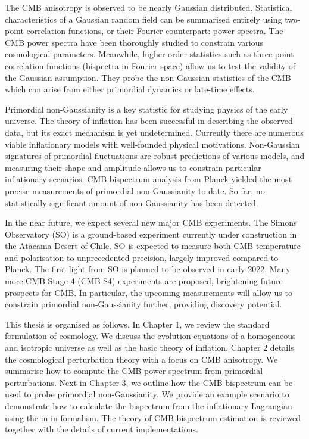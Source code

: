 The CMB anisotropy is observed to be nearly Gaussian distributed. Statistical characteristics of a Gaussian random field can be summarised entirely using two-point correlation functions, or their Fourier counterpart: power spectra. The CMB power spectra have been thoroughly studied to constrain various cosmological parameters. Meanwhile, higher-order statistics such as three-point correlation functions (bispectra in Fourier space) allow us to test the validity of the Gaussian assumption. They probe the non-Gaussian statistics of the CMB which can arise from either primordial dynamics or late-time effects.

Primordial non-Gaussianity is a key statistic for studying physics of the early universe. The theory of inflation has been successful in describing the observed data, but its exact mechanism is yet undetermined. Currently there are numerous viable inflationary models with well-founded physical motivations. Non-Gaussian signatures of primordial fluctuations are robust predictions of various models, and measuring their shape and amplitude allows us to constrain particular inflationary scenarios. CMB bispectrum analysis from Planck yielded the most precise measurements of primordial non-Gaussianity to date. So far, no statistically significant amount of non-Gaussianity has been detected.

In the near future, we expect several new major CMB experiments. The Simons Observatory (SO) \cite{TheSimonsObservatoryCollaboration2018} is a ground-based experiment currently under construction in the Atacama Desert of Chile. SO is expected to measure both CMB temperature and polarisation to unprecedented precision, largely improved compared to Planck. The first light from SO is planned to be observed in early 2022. Many more CMB Stage-4 (CMB-S4) experiments are proposed, brightening future prospects for CMB. In particular, the upcoming measurements will allow us to constrain primordial non-Gaussianity further, providing discovery potential.

This thesis is organised as follows. In Chapter 1, we review the standard formulation of cosmology. We discuss the evolution equations of a homogeneous and isotropic universe as well as the basic theory of inflation. Chapter 2 details the cosmological perturbation theory with a focus on CMB anisotropy. We summarise how to compute the CMB power spectrum from primordial perturbations. Next in Chapter 3, we outline how the CMB bispectrum can be used to probe primordial non-Gaussianity. We provide an example scenario to demonstrate how to calculate the bispectrum from the inflationary Lagrangian using the in-in formalism. The theory of CMB bispectrum estimation is reviewed together with the details of current implementations.

